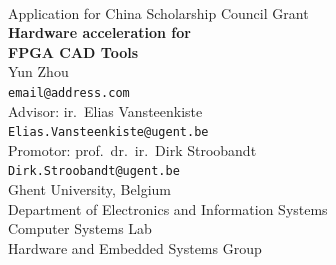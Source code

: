 \documentclass[a4paper,oneside,12pt]{article}
\begin{document}

\thispagestyle{empty}

\begin{center}
\mbox{}\\\vspace{5mm}
{\Large Application for China Scholarship Council Grant}\\ [45mm]
%
{\bf\Huge Hardware acceleration for\\
[3mm] FPGA CAD Tools} \\
\vspace{45mm}
\Large Yun Zhou \\
\vspace{2mm}
\small\texttt{email@address.com} \\
\vspace{20mm}
\Large Advisor: ir.\ Elias Vansteenkiste \\
\small\texttt{Elias.Vansteenkiste@ugent.be} \\
\vspace{2mm}
\Large Promotor: prof.\ dr.\ ir.\ Dirk Stroobandt \\
\small\texttt{Dirk.Stroobandt@ugent.be} \\
\vspace{20mm}
\normalsize Ghent University, Belgium \\
\normalsize Department of Electronics and Information Systems\\
\normalsize Computer Systems Lab\\
\normalsize Hardware and Embedded Systems Group 
\end{center}








\end{document}
